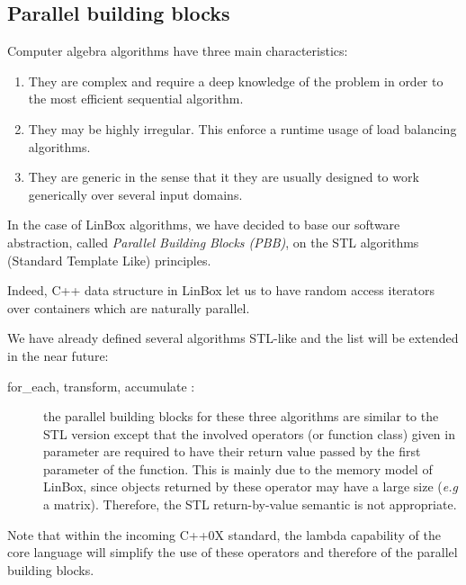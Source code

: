 \documentclass[runningheads,a4paper]{llncs}
\newcommand{\linbox}{{\sc LinBox}\xspace}
\begin{document}
\subsection{Parallel building blocks}
Computer algebra algorithms have three main characteristics:
\begin{enumerate}
\item They are complex and require a deep knowledge of the problem in
  order to the most efficient sequential algorithm.
\item They may be highly irregular. This enforce a runtime usage of
  load balancing algorithms.
\item They are generic in the sense that it they are usually designed
  to work generically over several input domains.
\end{enumerate}

  In the case of \linbox algorithms, we have decided to base our
  software abstraction, called {\em Parallel Building Blocks (PBB)},
  on the STL algorithms (Standard Template Like) principles.

  Indeed, C++ data structure in \linbox let us to have random access
  iterators over containers which are naturally parallel. 
  
  We have already defined several algorithms STL-like and the list
  will be extended in the near future:
  \begin{description} 
    
  \item [for\_each, transform, accumulate \cite{Musser:1996:STL}:] the parallel building
    blocks for these three algorithms are similar to the STL version 
    except that the involved operators (or function class) given in
    parameter are required to have their return value passed by the
    first parameter of the function. 
    This is mainly due to the memory model of \linbox, since objects
    returned by these operator may have a large size (\textit{e.g} a
    matrix).
    Therefore, the STL return-by-value semantic is not appropriate. 
  \end{description} 
  
  Note that within the incoming C++0X standard, the lambda capability
  of the core language will simplify the use of these operators and
  therefore of the parallel
  building blocks.


  
\end{document}
